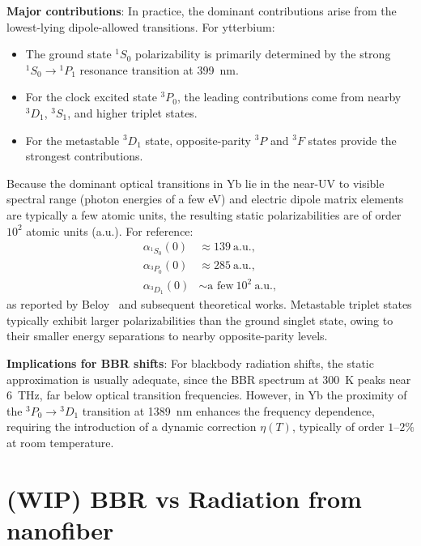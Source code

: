 \documentclass[aps,pra, onecolumn,superscriptaddress,nopacs,floatfix, showkeys, notitlepage]{revtex4-1}
\begin{document}
{\bf Major contributions}: In practice, the dominant contributions arise from the lowest-lying dipole-allowed transitions. For ytterbium:
\begin{itemize}
    \item The ground state $^1S_0$ polarizability is primarily determined by the strong $^1S_0 \rightarrow {}^1P_1$ resonance transition at 399~nm.
    \item For the clock excited state $^3P_0$, the leading contributions come from nearby $^3D_1$, $^3S_1$, and higher triplet states.
    \item For the metastable $^3D_1$ state, opposite-parity $^3P$ and $^3F$ states provide the strongest contributions.
\end{itemize}
Because the dominant optical transitions in Yb lie in the near-UV to visible spectral range (photon energies of a few eV) and electric dipole matrix elements are typically a few atomic units, the resulting static polarizabilities are of order $10^2$ atomic units (a.u.). 
For reference:
\begin{align}
    \alpha_{^1S_0}(0) &\approx 139~\mathrm{a.u.}, \\
    \alpha_{^3P_0}(0) &\approx 285~\mathrm{a.u.}, \\
    \alpha_{^3D_1}(0) &\sim \text{a few}~10^2~\mathrm{a.u.},
\end{align}
as reported by Beloy~\cite{Beloy2012} and subsequent theoretical works. Metastable triplet states typically exhibit larger polarizabilities than the ground singlet state, owing to their smaller energy separations to nearby opposite-parity levels.

{\bf Implications for BBR shifts}: For blackbody radiation shifts, the static approximation is usually adequate, since the BBR spectrum at 300~K peaks near 6~THz, far below optical transition frequencies.
However, in Yb the proximity of the $^3P_0 \rightarrow {}^3D_1$ transition at 1389~nm enhances the frequency dependence, requiring the introduction of a dynamic correction $\eta(T)$, typically of order $1$--$2\%$ at room temperature.

\section{(WIP) BBR vs Radiation from nanofiber}

\fi

 
\end{document}
